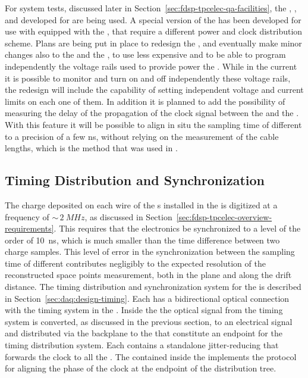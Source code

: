 For system tests, discussed later in Section~\ref{sec:fdsp-tpcelec-qa-facilities},
the , , and  developed for 
are being used. A special version of the  has been developed
for use with  equipped with the  ,
that require a different power and clock distribution scheme. Plans are
being put in place to redesign the , and eventually make 
minor changes also to the  and the , to use 
less expensive  and to be able to program independently
the voltage rails used to provide power the . While in
the current  it is possible to monitor and turn on and off
independently these voltage rails, the redesign will include the
capability of setting independent voltage and current limits on each
one of them. In addition it is planned to add the possibility of measuring
the delay of the propagation
of the clock signal between the  and the . With
this feature it will be possible to align in situ the sampling time of different
 to a precision of a few ns, without relying on the 
measurement of the cable lengths, which is the method that was used
in .


\subsection{Timing Distribution and Synchronization}
\label{sec:fdsp-tpcelec-design-timing}

The charge deposited on each wire of the s installed 
in the   is digitized at a frequency of
$\sim\,\SI{2}{MHz}$, as discussed in 
Section~\ref{sec:fdsp-tpcelec-overview-requirements}. This requires
that the  electronics be synchronized to a level of the order of \SI{10}{ns}, which is
much smaller than the time difference between two charge samples.
This level of error in the synchronization between the sampling time of different
 contributes negligibly to the expected resolution %
of the reconstructed space points measurement,
both in the  plane and along the drift distance.
The timing distribution and synchronization system for the 
 is described in Section~\ref{sec:daq:design-timing}.
Each  has a bidirectional optical connection with the
timing system in the . Inside the  the optical
signal from the timing system is converted, as discussed in the previous
section, to an electrical signal and distributed via the backplane to
the  that constitute an endpoint for the timing distribution
system. Each  contains a standalone jitter-reducing  
that forwards the clock to all the . The
 contained inside the  implements the 
protocol~\cite{bib:docdb1651,bib:docdb11233} for aligning
the phase of the clock at the endpoint of the distribution tree.

